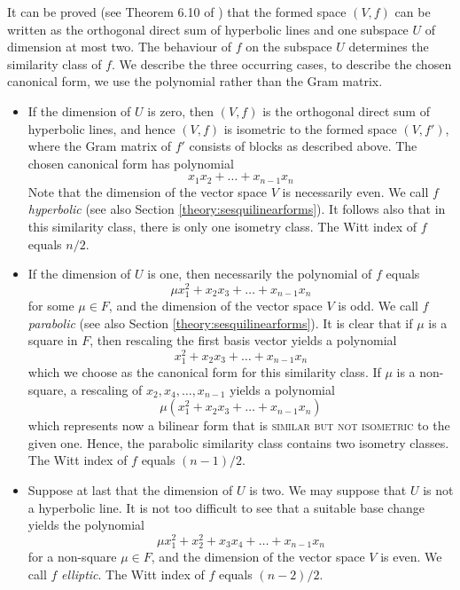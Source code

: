 \documentclass[a4paper,11pt]{report}
\begin{document}
{{{ It can be proved (see Theorem 6.10 of \cite{Cameron}) that the formed space $(V,f)$ can be written as the orthogonal direct sum of hyperbolic lines and one
subspace $U$ of dimension at most two. The behaviour of $f$ on the subspace $U$ determines the similarity class of $f$. We describe the three occurring cases, to describe the chosen canonical
form, we use the polynomial rather than the Gram matrix. 

 
\begin{itemize}
\item If the dimension of $U$ is zero, then $(V,f)$ is the orthogonal direct sum of hyperbolic lines, and hence $(V,f)$ is isometric to the formed space $(V,f')$, where the Gram matrix of $f'$ consists of blocks as described above. The chosen canonical form has
polynomial 
\[ x_1 x_2 + \ldots + x_{n-1}x_n \]
 Note that the dimension of the vector space $V$ is necessarily even. We call $f$ \emph{hyperbolic} (see also Section \ref{theory:sesquilinearforms}). It follows also that in this similarity class, there is only one isometry
class. The Witt index of $f$ equals $n/2$. 
\item If the dimension of $U$ is one, then necessarily the polynomial of $f$ equals 
\[ \mu x_1^2 + x_2 x_3 + \ldots + x_{n-1}x_n \]
 for some $\mu \in F$, and the dimension of the vector space $V$ is odd. We call $f$ \emph{parabolic} (see also Section \ref{theory:sesquilinearforms}). It is clear that if $\mu$ is a square in $F$, then rescaling the first basis vector yields a polynomial 
\[ x_1^2 + x_2 x_3 + \ldots + x_{n-1}x_n \]
 which we choose as the canonical form for this similarity class. If $\mu$ is a non-square, a rescaling of $x_2,x_4,\ldots,x_{n-1}$ yields a polynomial 
\[ \mu (x_1^2 + x_2 x_3 + \ldots + x_{n-1}x_n) \]
 which represents now a bilinear form that is \textsc{similar but not isometric} to the given one. Hence, the parabolic similarity class contains two isometry
classes. The Witt index of $f$ equals $(n-1)/2$. 
\item  Suppose at last that the dimension of $U$ is two. We may suppose that $U$ is not a hyperbolic line. It is not too difficult to see that a suitable base
change yields the polynomial 
\[ \mu x_1^2 + x_2^2 + x_3 x_4 + \ldots + x_{n-1}x_n \]
 for a non-square $\mu \in F$, and the dimension of the vector space $V$ is even. We call $f$ \emph{elliptic}. The Witt index of $f$ equals $(n-2)/2$. 
\end{itemize}
 }

 
}}
\end{document}
